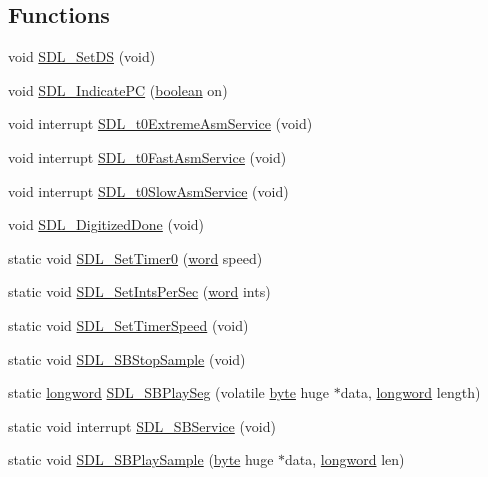 \subsection*{Functions}
\begin{DoxyCompactItemize}
\item 
void \hyperlink{ID__SD_8C_ad09a3e5c420fbc2e1920f64d496a3bc4}{SDL\_\-SetDS} (void)
\item 
void \hyperlink{ID__SD_8C_a6e015404fba7543853cacd8420353315}{SDL\_\-IndicatePC} (\hyperlink{ID__HEAD_8H_a7c6368b321bd9acd0149b030bb8275ed}{boolean} on)
\item 
void interrupt \hyperlink{ID__SD_8C_a310e24eb0bb48c6c4417eab2a7841e15}{SDL\_\-t0ExtremeAsmService} (void)
\item 
void interrupt \hyperlink{ID__SD_8C_ab2123ddce52686655810e1b5ff3c2cc9}{SDL\_\-t0FastAsmService} (void)
\item 
void interrupt \hyperlink{ID__SD_8C_aee695286ef3f3f5f5c4e2d14c88b5e2f}{SDL\_\-t0SlowAsmService} (void)
\item 
void \hyperlink{ID__SD_8C_a4de0adfa6affaec933d21e3d0967faf0}{SDL\_\-DigitizedDone} (void)
\item 
static void \hyperlink{ID__SD_8C_a4bc3d9ad81cb035c1487a23854c9ccbe}{SDL\_\-SetTimer0} (\hyperlink{ID__HEAD_8H_abad51e07ab6d26bec9f1f786c8d65bcd}{word} speed)
\item 
static void \hyperlink{ID__SD_8C_a70d1b72a654197d7c8c8c3ffbc22760c}{SDL\_\-SetIntsPerSec} (\hyperlink{ID__HEAD_8H_abad51e07ab6d26bec9f1f786c8d65bcd}{word} ints)
\item 
static void \hyperlink{ID__SD_8C_a51f0387c80c08ae6998f221ee1d6f708}{SDL\_\-SetTimerSpeed} (void)
\item 
static void \hyperlink{ID__SD_8C_ad0bed6aae151cee1ce9b468e83a16c57}{SDL\_\-SBStopSample} (void)
\item 
static \hyperlink{ID__HEAD_8H_a8a9a7dd50c6fdb45dcdf0eb929479663}{longword} \hyperlink{ID__SD_8C_a4c2002d25ab5bf2f1d36e7253a6111dc}{SDL\_\-SBPlaySeg} (volatile \hyperlink{ID__HEAD_8H_a0c8186d9b9b7880309c27230bbb5e69d}{byte} huge $\ast$data, \hyperlink{ID__HEAD_8H_a8a9a7dd50c6fdb45dcdf0eb929479663}{longword} length)
\item 
static void interrupt \hyperlink{ID__SD_8C_ae4006462bf5e2e456f22aed3a75fd07e}{SDL\_\-SBService} (void)
\item 
static void \hyperlink{ID__SD_8C_a3ff88aa9463c98a55f373152277e70f7}{SDL\_\-SBPlaySample} (\hyperlink{ID__HEAD_8H_a0c8186d9b9b7880309c27230bbb5e69d}{byte} huge $\ast$data, \hyperlink{ID__HEAD_8H_a8a9a7dd50c6fdb45dcdf0eb929479663}{longword} len)

\end{DoxyCompactItemize}
